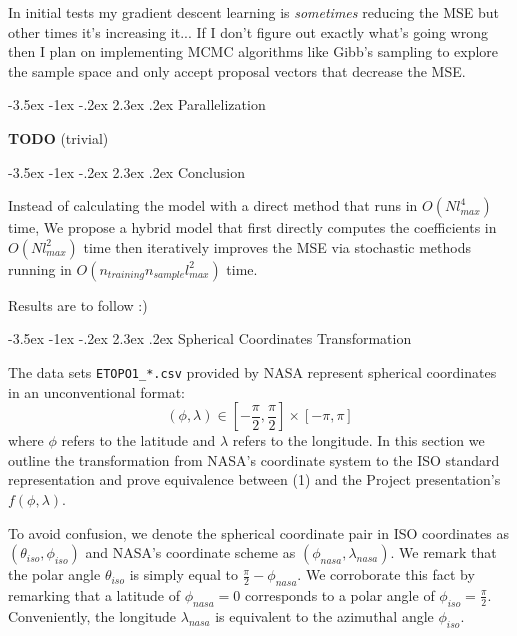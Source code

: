 \documentclass[a4paper]{article}
\makeatletter
\renewcommand\section{\@startsection{section}{1}{\z@}%
                                  {-3.5ex \@plus -1ex \@minus -.2ex}%
                                  {2.3ex \@plus.2ex}%
                                  {\normalfont\normalsize\bfseries}}
\theoremstyle{definition}
\makeatother
\begin{document}
In initial tests my gradient descent learning is \textit{sometimes} reducing the MSE but other times it's increasing it... If I don't figure out exactly what's going wrong 
then I plan on implementing MCMC algorithms like Gibb's sampling to explore the sample space and only accept proposal vectors that decrease the MSE.

\section{Parallelization} 

\textbf{TODO} (trivial)

\section{Conclusion}

Instead of calculating the model with a direct method that runs in $O(Nl_{max}^4)$ time, We propose a hybrid model that first directly computes the coefficients in $O(Nl_{max}^2)$ time then 
iteratively improves the MSE via stochastic methods running in $O(n_{training}n_{sample}l_{max}^2)$ time.

Results are to follow :)





\appendix
\section{Spherical Coordinates Transformation}

The data sets \verb|ETOPO1_*.csv| provided by NASA represent spherical coordinates in an unconventional format: $$(\phi, \lambda) \in [-\frac{\pi}{2}, \frac{\pi}{2}] \times [-\pi, \pi] $$ where $\phi$ refers to the latitude
and $\lambda$ refers to the longitude. In this section we outline the transformation from NASA's coordinate system to the ISO standard representation and prove equivalence between (1) and the Project presentation's $f(\phi, \lambda)$.

To avoid confusion, we denote the spherical coordinate pair in ISO coordinates as $(\theta_{iso}, \phi_{iso})$ and NASA's coordinate scheme as $(\phi_{nasa}, \lambda_{nasa})$.
We remark that the polar angle $\theta_{iso}$ is simply equal to $\frac{\pi}{2} - \phi_{nasa}$. We corroborate this fact by remarking that a latitude of $\phi_{nasa} = 0$ corresponds to a polar
angle of $\phi_{iso} = \frac{\pi}{2}$. Conveniently, the longitude $\lambda_{nasa}$ is equivalent to the azimuthal angle $\phi_{iso}$.
\end{document}
